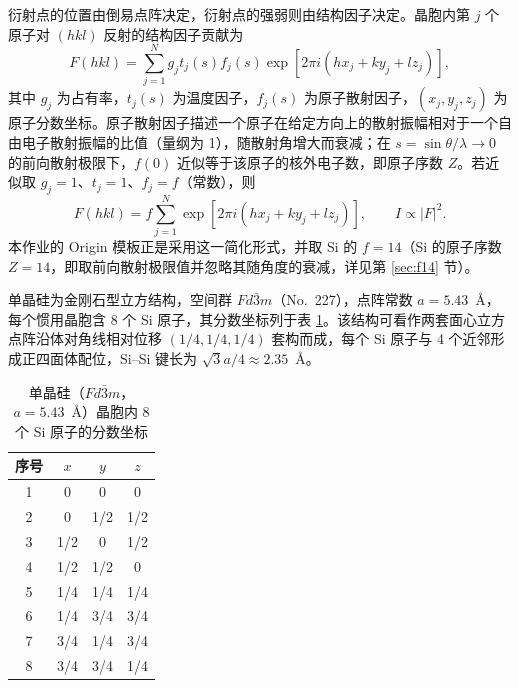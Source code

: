 衍射点的位置由倒易点阵决定，衍射点的强弱则由结构因子决定。晶胞内第 $j$ 个原子对 $(hkl)$ 反射的结构因子贡献为
\begin{equation}
F(hkl)=\sum_{j=1}^{N}g_jt_j(s)f_j(s)\exp\left[2\pi i(hx_j+ky_j+lz_j)\right],
\label{eq:structure-factor}
\end{equation}
其中 $g_j$ 为占有率，$t_j(s)$ 为温度因子，$f_j(s)$ 为原子散射因子，$(x_j,y_j,z_j)$ 为原子分数坐标。原子散射因子描述一个原子在给定方向上的散射振幅相对于一个自由电子散射振幅的比值（量纲为 1），随散射角增大而衰减；在 $s=\sin\theta/\lambda\to0$ 的前向散射极限下，$f(0)$ 近似等于该原子的核外电子数，即原子序数 $Z$。若近似取 $g_j=1$、$t_j=1$、$f_j=f$（常数），则
\begin{equation}
F(hkl)=f\sum_{j=1}^{N}\exp\left[2\pi i(hx_j+ky_j+lz_j)\right],\qquad I\propto|F|^2.
\label{eq:structure-factor-simple}
\end{equation}
本作业的 Origin 模板正是采用这一简化形式，并取 Si 的 $f=14$（Si 的原子序数 $Z=14$，即取前向散射极限值并忽略其随角度的衰减，详见第 \ref{sec:f14} 节）。

单晶硅为金刚石型立方结构，空间群 $Fd\bar{3}m$（No.~227），点阵常数 $a=5.43$~\AA，每个惯用晶胞含 8 个 Si 原子，其分数坐标列于表 \ref{tab:si-atoms}。该结构可看作两套面心立方点阵沿体对角线相对位移 $(1/4,1/4,1/4)$ 套构而成，每个 Si 原子与 4 个近邻形成正四面体配位，Si--Si 键长为 $\sqrt{3}a/4\approx2.35$~\AA。

\begin{table}[H]
  \centering
  \caption{单晶硅（$Fd\bar{3}m$，$a=5.43$~\AA）晶胞内 8 个 Si 原子的分数坐标}
  \label{tab:si-atoms}
  \small
  \begin{tabular}{cccc}
    \toprule
    序号 & $x$ & $y$ & $z$ \\
    \midrule
    1 & 0     & 0     & 0     \\
    2 & 0     & 1/2   & 1/2   \\
    3 & 1/2   & 0     & 1/2   \\
    4 & 1/2   & 1/2   & 0     \\
    5 & 1/4   & 1/4   & 1/4   \\
    6 & 1/4   & 3/4   & 3/4   \\
    7 & 3/4   & 1/4   & 3/4   \\
    8 & 3/4   & 3/4   & 1/4   \\
    \bottomrule
  \end{tabular}
\end{table}

